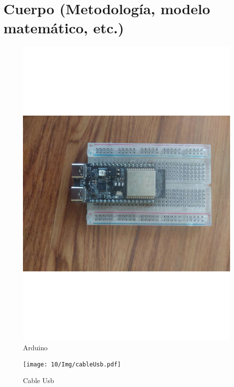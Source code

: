     \section{Cuerpo (Metodología, modelo matemático, etc.)}
    \begin{figure}[H]
        \centering
        \includegraphics[trim = {40mm 120mm 50mm 100mm},clip,scale=0.2]{10/Img/arduino.pdf}
        \caption{Arduino}
        \label{Arduino}
    \end{figure}

\begin{figure}[H]
        \centering
        \texttt{[image: 10/Img/cableUsb.pdf]}
        \caption{Cable Usb}
        \label{Cable usbl}
    \end{figure}
    
